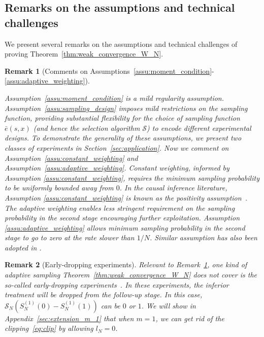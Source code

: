 \documentclass[12pt]{article}
\newtheorem{remark}{Remark}
\begin{document}
\subsection{Remarks on the assumptions and technical challenges}\label{sec:remarks_weak_convergence}

We present several remarks on the assumptions and technical challenges of proving Theorem~\ref{thm:weak_convergence_W_N}. 

\begin{remark}[Comments on Assumptions~\ref{assu:moment_condition}-\ref{assu:adaptive_weighting}]\label{rmk:positivity-l-N}
	
	Assumption~\ref{assu:moment_condition} is a mild regularity assumption. Assumption~\ref{assu:sampling_design} imposes mild restrictions on the sampling function,
	providing substantial flexibility for the choice of sampling function $\bar e(s,x)$ 
	(and hence the selection algorithm $\mathcal{S}$) to encode different experimental designs. To demonstrate the generality of these assumptions, we present two classes of experiments in Section~\ref{sec:application}. Now we comment on Assumption~\ref{assu:constant_weighting} and Assumption~\ref{assu:adaptive_weighting}. 
	Constant weighting, informed by Assumption \ref{assu:constant_weighting}, 
	requires the minimum sampling probability to be uniformly bounded away from $0$. In the causal inference literature, Assumption \ref{assu:constant_weighting} is known as the positivity assumption~\citep{crump2009dealing,imbens2015causal}. The adaptive weighting enables less stringent requirement on the sampling probability in the second stage encouraging further exploitation. Assumption \ref{assu:adaptive_weighting} allows minimum sampling probability in the second stage to go to zero at the rate slower than $1/N$. Similar assumption has also been adopted in \citet{Zhang2020,Hadad2021}. 
\end{remark}


\begin{remark}[Early-dropping experiments]\label{rmk:early-dropping}
	Relevant to Remark~\ref{rmk:positivity-l-N}, one kind of adaptive sampling Theorem~\ref{thm:weak_convergence_W_N} does not cover is the so-called early-dropping experiments~\citep{sampson2005drop,sill2009drop}. In these experiments, the inferior treatment will be dropped from the follow-up stage. In this case, $\mathcal{S}_N(S_N^{(1)}(0) - S_N^{(1)}(1)) $ can be $0$ or $1$. We will show in Appendix~\ref{sec:extension_m_1} that when $m=1$, we can get rid of the clipping~\eqref{eq:clip} by allowing $l_N=0$. 
\end{remark}
\end{document}
